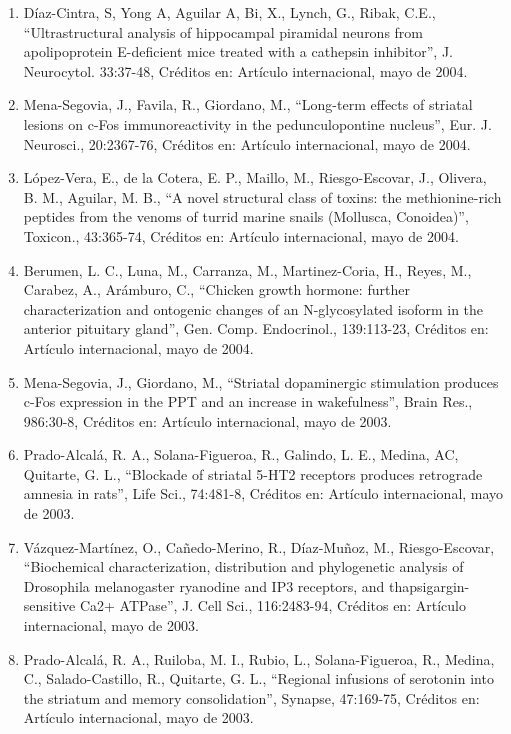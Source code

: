 \documentclass[12pt]{article}
\begin{document}
\begin{enumerate}
\item Díaz-Cintra, S, Yong A, Aguilar A, Bi, X., Lynch, G., Ribak, C.E., “Ultrastructural analysis of hippocampal piramidal neurons 
from 
apolipoprotein E-deficient mice treated with a cathepsin inhibitor”, J. Neurocytol. 33:37-48, Créditos en: Artículo internacional, mayo 
de 2004.

\item Mena-Segovia, J., Favila, R., Giordano, M., “Long-term effects of striatal lesions on c-Fos immunoreactivity in the 
pedunculopontine nucleus”, Eur. J. Neurosci., 20:2367-76, Créditos en: Artículo internacional, mayo de 2004.

\item López-Vera, E., de la Cotera, E. P., Maillo, M., Riesgo-Escovar, J., Olivera, B. M., Aguilar, M. B., “A novel structural class of 
toxins: the methionine-rich peptides from the venoms of turrid marine snails (Mollusca, Conoidea)”, Toxicon., 43:365-74, Créditos en: 
Artículo internacional, mayo de 2004.

\item Berumen, L. C., Luna, M., Carranza, M., Martinez-Coria, H., Reyes, M., Carabez, A., Arámburo, C., “Chicken growth hormone: 
further 
characterization and ontogenic changes of an N-glycosylated isoform in the anterior pituitary gland”, Gen. Comp. Endocrinol., 
139:113-23, Créditos en: Artículo internacional, mayo de 2004.

\item Mena-Segovia, J., Giordano, M., “Striatal dopaminergic stimulation produces c-Fos expression in the PPT and an increase in 
wakefulness”, Brain Res., 986:30-8, Créditos en: Artículo internacional, mayo de 2003.

\item Prado-Alcalá, R. A., Solana-Figueroa, R., Galindo, L. E., Medina, AC, Quitarte, G. L., “Blockade of striatal 5-HT2 receptors 
produces retrograde amnesia in rats”, Life Sci., 74:481-8, Créditos en: Artículo internacional, mayo de 2003.

\item Vázquez-Martínez, O., Cañedo-Merino, R., Díaz-Muñoz, M., Riesgo-Escovar, “Biochemical characterization, distribution and 
phylogenetic analysis of Drosophila melanogaster ryanodine and IP3 receptors, and thapsigargin-sensitive Ca2+ ATPase”, J. Cell Sci., 
116:2483-94, Créditos en: Artículo internacional, mayo de 2003.

\item Prado-Alcalá, R. A., Ruiloba, M. I., Rubio, L., Solana-Figueroa, R., Medina, C., Salado-Castillo, R., Quitarte, G. L., “Regional 
infusions of serotonin into the striatum and memory consolidation”, Synapse, 47:169-75, Créditos en: Artículo internacional, mayo de 
2003.


\end{enumerate}
\end{document}

